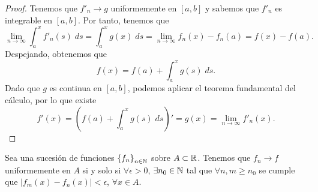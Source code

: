 \begin{proof}
	Tenemos que $\displaystyle f'_{n} \to g $ uniformemente en $\displaystyle \left[a,b\right]  $ y sabemos que $\displaystyle f'_{n} $ es integrable en $\displaystyle \left[a,b\right]  $. Por tanto, tenemos que
	\[\lim_{n \to \infty}\int^{x}_{a} f'_{n}\left(s\right) \; d s = \int^{x}_{a} g\left(x\right) \; d s  = \lim_{n \to \infty}f_{n}\left(x\right)-f_{n}\left(a\right) = f\left(x\right)-f\left(a\right).\]
Despejando, obtenemos que
\[f\left(x\right) = f\left(a\right) + \int^{x}_{a} g\left(s\right) \; d s .\]
Dado que $\displaystyle g $ es continua en $\displaystyle \left[a,b\right]  $, podemos aplicar el teorema fundamental del cálculo, por lo que existe
\[f'\left(x\right) = \left(f\left(a\right) + \int^{x}_{a} g\left(s\right) \; d s\right)' = g\left(x\right) = \lim_{n \to \infty}f'_{n}\left(x\right) .\]
\end{proof}
\begin{ftheorem}
	\normalfont Sea una sucesión de funciones $\displaystyle \left\{ f_{n}\right\} _{n\in\mathbb{N}}  $ sobre $\displaystyle A \subset \mathbb{R} $. Tenemos que $\displaystyle f_{n} \to f $ uniformemente en $\displaystyle A $ si y solo si $\displaystyle \forall \epsilon > 0 $, $\displaystyle \exists n_{0} \in \mathbb{N} $ tal que $\displaystyle \forall n,m \geq n_{0} $ se cumple que $\displaystyle \left|f_{m}\left(x\right)-f_{n}\left(x\right)\right|<\epsilon  $, $\displaystyle \forall x \in A $.
\end{ftheorem}
